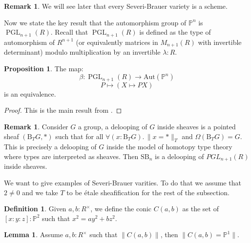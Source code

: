 \documentclass[10pt,a4paper]{article}
\theoremstyle{definition}
\newtheorem{lemma}[theorem]{Lemma}
\newtheorem{definition}[theorem]{Definition}
\newtheorem{remark}[theorem]{Remark}
\newtheorem{proposition}[theorem]{Proposition}
\DeclareMathOperator{\PGL}{PGL}
\newcommand{\SB}{\mathrm{SB}}
\newcommand{\propTrunc}[1]{\lVert #1 \rVert}
\newcommand{\bP}{\mathbb{P}}
\newcommand{\Aut}{\mathrm{Aut}}
\begin{document}
\begin{remark}
We will see later that every Severi-Brauer variety is a scheme. 
\end{remark}

Now we state the key result that the automorphism group of $\bP^n$ is $\PGL_{n+1}(R)$. Recall that $\PGL_{n+1}(R)$ is defined as the type of automorphism of $R^{n+1}$ (or equivalently matrices in $M_{n+1}(R)$ with invertible determinant) modulo multiplication by an invertible $\lambda:R$.

\begin{proposition}\label{Aut-Pn-PGL}
The map:
\[\beta:\PGL_{n+1}(R)\to\Aut(\bP^n)\]
\[P\mapsto (X\mapsto PX)\]
is an equivalence.
\end{proposition}

\begin{proof}
This is the main result from \cite{sag-projective}.
\end{proof}

\begin{remark}\label{SB-is-delooping}
Consider $G$ a group, a delooping of $G$ inside sheaves is a pointed sheaf $(\mathrm{B}_TG,*)$ such that for all $\forall(x:\mathrm{B}_TG).\, \propTrunc{x=*}_T$ and $\Omega (\mathrm{B}_TG) = G$. This is precisely a delooping of $G$ inside the model of homotopy type theory where types are interpreted as sheaves. Then $\SB_n$ is a delooping of $PGL_{n+1}(R)$ inside sheaves.
\end{remark}

We want to give examples of Severi-Brauer varities. To do that we assume that $2\not=0$ and we take $T$ to be étale sheafification for the rest of the subsection.

\begin{definition}
Given $a,b:R^\times$, we define the conic $C(a,b)$ as the set of $[x:y:z]:\bP^2$ such that $x^2=ay^2+bz^2$.
\end{definition}

\begin{lemma}\label{pointed-conics-projective}
Assume $a,b:R^\times$ such that $\propTrunc{C(a,b)}$, then $\propTrunc{C(a,b)=\bP^1}$.
\end{lemma}
\end{document}
